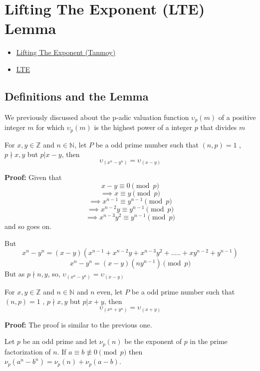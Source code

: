\chapter{Lifting The Exponent (LTE) Lemma}%
\begin{linkb}
   \begin{itemize}
        \item \href{https://www.youtube.com/watch?v=D7Pt_mROJcw}{Lifting The Exponent (Tanmoy)}
        \item \href{https://drive.google.com/file/d/1en-kqZcoNRirudjEO_iTA67T6MgCBGPi/view}{LTE} 
   \end{itemize}
\end{linkb}
\section{Definitions and the Lemma}

We previously discussed about the p-adic valuation function $\upsilon_p(m)$ of a positive integer $m$ for which $\upsilon_p(m)$ is the highest power of a integer $p$ that divides  $m$

\begin{lemma}
 For $x,y \in \mathbb{Z}$ and  $n \in \mathbb{N}$, let $P$ be a odd prime number such that $(n,p)=1$ , $p\nmid x, y$ but $p|x-y$, then $$\upsilon_(x^n-y^n)=\upsilon_(x-y)$$
\end{lemma}

\textbf{Proof:} Given that $$x-y \equiv  0 \pmod p$$ $$\implies x \equiv y \pmod p$$ $$\implies x^{n-1} \equiv y^{n-1} \pmod p$$ $$\implies x^{n-2}y \equiv y^{n-1} \pmod p$$  $$\implies x^{n-3}y^2 \equiv y^{n-1} \pmod p$$ and so  goes on.

But $$x^n-y^n=(x-y)(x^{n-1}+ x^{n-2}y+x^{n-3}y^2+.....+xy^{n-2}+y^{n-1})$$
$$x^n-y^n=(x-y)(ny^{n-1}) \pmod p$$
But as $p \nmid n, y$, so,  $\upsilon_(x^n-y^n)=\upsilon_(x-y)$ 

\begin{lemma}
 For $x,y \in \mathbb{Z}$ and  $n \in \mathbb{N}$ and $n$ even, let $P$ be a odd prime number such that $(n,p)=1$ , $p\nmid x, y$ but $p|x+y$, then $$\upsilon_(x^n+y^n)=\upsilon_(x+y)$$
\end{lemma}
\textbf{Proof:} The proof is similar to the previous one.

\begin{theorem} 
Let $p$ be an odd prime and let $\nu_p(n)$
	be the exponent of $p$ in the prime factorization of $n$.
	If $a \equiv b \not\equiv 0 \pmod p$ then
	$\nu_p(a^n-b^n) = \nu_p(n) + \nu_p(a-b)$.

\end{theorem}

